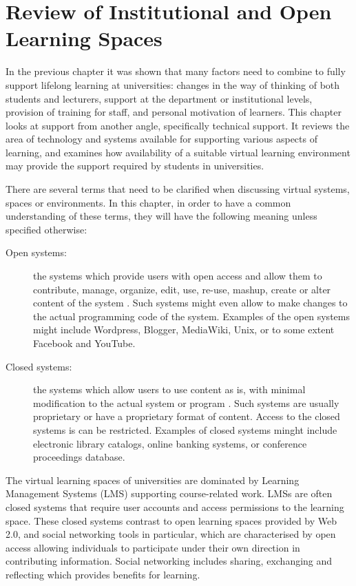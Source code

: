 \chapter{Review of Institutional and Open Learning Spaces \label{cha:systudy}}
In the previous chapter it was shown that many factors need to combine to fully
support lifelong learning at universities: changes in the way of thinking of
both students and lecturers, support at the department or institutional levels,
provision of training for staff, and personal motivation of learners. This
chapter looks at \LLLs support from another angle, specifically technical
support. It reviews the area of technology and systems available for supporting
various aspects of learning, and examines how availability of a suitable virtual
learning environment may provide the \LLLs support required by students in
universities.

There are several terms that need to be clarified when discussing virtual
systems, spaces or environments. In this chapter, in order to have a common
understanding of these terms, they will have the following meaning unless
specified otherwise:

\begin{description}
	\item[Open systems:] the systems which provide users with open access and allow
	them to contribute, manage, organize, edit, use, re-use, mashup, create or
	alter content of the system \citep{Fay2009}. Such systems might even allow to
	make changes to the actual programming code of the system. Examples of the open
	systems might include Wordpress, Blogger, MediaWiki, Unix, or to some extent
	Facebook and YouTube.
	\item[Closed systems:] the systems which allow users to use content as is, with
	minimal modification to the actual system or program \citep{Fay2009}. Such
	systems are usually proprietary or have a proprietary format of content. Access
	to the closed systems is can be restricted. Examples of closed systems
	minght include electronic library catalogs, online banking systems, or
	conference proceedings database.
\end{description}

The virtual learning spaces of universities are dominated by Learning Management
Systems (LMS) supporting course-related work. LMSs are often closed systems that
require user accounts and access permissions to the learning space. These
closed systems contrast to open learning spaces provided by Web 2.0, and social
networking tools in particular, which are characterised by open access allowing
individuals to participate under their own direction in contributing
information. Social networking includes sharing, exchanging and reflecting which
provides benefits for learning. 
 
